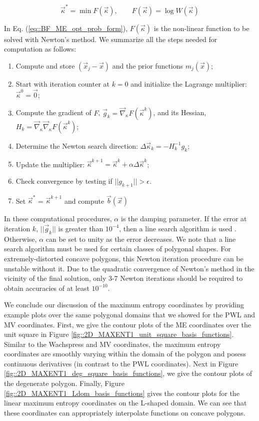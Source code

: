 \begin{equation}
\label{eq::BF_ME_opt_prob_form}
\vec{\kappa}^* = \min F(\vec{\kappa}) , \qquad F(\vec{\kappa}) = \log W (\vec{\kappa})
\end{equation}

\noindent In Eq. (\ref{eq::BF_ME_opt_prob_form}),  $F(\vec{\kappa})$ is the non-linear function to be solved with Newton's method. We summarize all the steps needed for computation as follows:

\begin{enumerate}
\item Compute and store $(\vec{x}_j - \vec{x})$ and the prior functions $m_j (\vec{x})$;
\item Start with iteration counter at $k=0$ and initialize the Lagrange multiplier: $\vec{\kappa}^0 = \vec{0}$;
\item Compute the gradient of $F$, $\vec{g}_k = \vec{\nabla}_{\kappa} F (\vec{\kappa}^k)$, and its Hessian, $H_k = \vec{\nabla}_{\kappa} \vec{\nabla}_{\kappa}  F (\vec{\kappa}^k)$;
\item Determine the Newton search direction: $\Delta \vec{\kappa}_k = - H_k^{-1} g_k$;
\item Update the multiplier: $\vec{\kappa}^{k+1} =\vec{\kappa}^k + \alpha \Delta \vec{\kappa}^k$;
\item Check convergence by testing if $|| g_{k+1} || > \epsilon$.
\item Set $\vec{\kappa}^*$ = $\vec{\kappa}^{k+1}$ and compute $\vec{b} (\vec{x})$
\end{enumerate}

In these computational procedures, $\alpha$ is the damping parameter. If the error at iteration $k$, $|| \vec{g}_{k} || $ is greater than $10^{-4}$, then a line search algorithm is used \cite{burden2001numerical}. Otherwise, $\alpha$ can be set to unity as the error decreases. We note that a line search algorithm must be used for certain classes of polygonal shapes. For extremely-distorted concave polygons, this Newton iteration procedure can be unstable without it. Due to the quadratic convergence of Newton's method in the vicinity of the final solution, only 3-7 Newton iterations should be required to obtain accuracies of at least $10^{-10}$. 

We conclude our discussion of the maximum entropy coordinates by providing example plots over the same polygonal domains that we showed for the PWL and MV coordinates. First, we give the contour plots of the ME coordinates over the unit square in Figure \ref{fig::2D_MAXENT1_unit_square_basis_functions}. Similar to the Wachspress and MV coordinates, the maximum entropy coordinates are smoothly varying within the domain of the polygon and posess continuous derivatives (in contrast to the PWL coordinates). Next in Figure \ref{fig::2D_MAXENT1_deg_square_basis_functions}, we give the contour plots of the degenerate polygon. Finally, Figure \ref{fig::2D_MAXENT1_Ldom_basis_functions} gives the contour plots for the linear maximum entropy coordinates on the L-shaped domain. We can see that these coordinates can appropriately interpolate functions on concave polygons.

